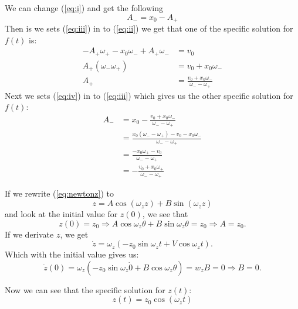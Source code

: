 \documentclass[english,notitlepage,reprint,nofootinbib]{revtex4-1}  %
\begin{document}
	We can change (\ref{eq:i}) and get the following
	\begin{equation} \label{eq:iii}
		A_- = x_0 - A_+
	\end{equation}
	Then is we sets (\ref{eq:iii}) in to (\ref{eq:ii}) we get that one of the specific solution for $f(t)$ is:
	\begin{align} \label{eq:iv}
		-A_+ \omega_+ - x_0 \omega_- + A_+ \omega_- &= v_0 \nonumber \\
		A_+ (\omega_- \omega_+) &= v_0 + x_0 \omega_- \nonumber \\
		A_+ &= \frac{v_0 + x_0 \omega_-}{\omega_- - \omega_+}
	\end{align}
	Next we sets (\ref{eq:iv}) in to (\ref{eq:iii}) which gives us the other specific solution for $f(t)$:
	\begin{align*}
		A_- &= x_0 - \frac{v_0 + x_0 \omega_-}{\omega_- - \omega_+} \\
		&= \frac{x_0 (\omega_- - \omega_+) - v_0 - x_0 \omega_-}{\omega_- - \omega_+} \\
		&= \frac{-x_0 \omega_+ - v_0}{\omega_- - \omega_+} \\
		&= - \frac{v_0 + x_0 \omega_+}{\omega_- - \omega_+}
	\end{align*}
	
	If we rewrite (\ref{eq:newtonz}) to 
	\begin{equation*}
		z = A \cos (\omega_z z) + B \sin (\omega_z z)
	\end{equation*}
	and look at the initial value for $z(0)$, we see that
	\begin{equation*}
		z(0) = z_0 \Rightarrow A \cos \omega_z \theta + B \sin \omega_z \theta = z_0 \Rightarrow A = z_0.
	\end{equation*}
	If we derivate $z$, we get 
	\begin{equation*}
		\dot{z} = \omega_z (-z_0 \sin \omega_z t + V \cos \omega_z t).
	\end{equation*}
	Which with the initial value gives us:
	\begin{equation*}
		\dot{z}(0) = \omega_z (- z_0 \sin \omega_z \dot 0 + B \cos \omega_z \theta) = w_z B = 0 \Rightarrow B = 0.
	\end{equation*}
	
	Now we can see that the specific solution for $z(t)$:
	\begin{equation*}
		z(t) = z_0 \cos (\omega_z t)
	\end{equation*}
	\onecolumngrid
	
	
	
	
\end{document}
